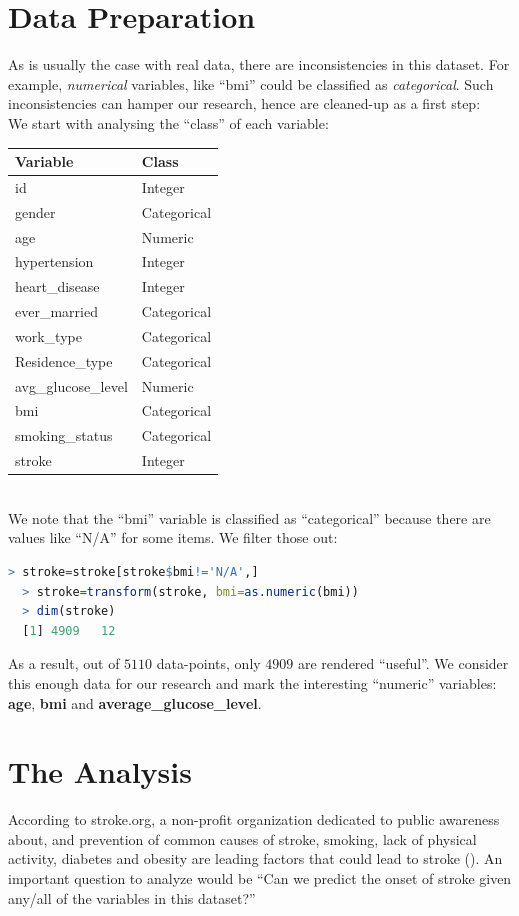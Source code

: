 \documentclass{article}
\begin{document}
\section*{Data Preparation}
As is usually the case with real data, there are inconsistencies in this dataset.
For example, \textit{numerical} variables, like ``bmi'' could be classified 
as \textit{categorical}. Such inconsistencies can hamper our research, 
hence are cleaned-up as a first step:\\

We start with analysing the ``class'' of each variable:\\

\begin{tabular}{l|l}\hline
  Variable & Class \\\hline
  id                  & Integer\\
  gender              & Categorical\\
  age                 & Numeric\\
  hypertension        & Integer\\
  heart\_disease      & Integer\\
  ever\_married       & Categorical\\
  work\_type          & Categorical\\
  Residence\_type     & Categorical\\
  avg\_glucose\_level & Numeric\\
  bmi                 & Categorical\\
  smoking\_status     & Categorical\\
  stroke              & Integer
\end{tabular}\\

We note that the ``bmi'' variable is classified as ``categorical''
because there are values like ``N/A'' for some items. We filter those out:
\begin{lstlisting}[backgroundcolor = \color{lightgray},language = R]
  > stroke=stroke[stroke$bmi!='N/A',]
  > stroke=transform(stroke, bmi=as.numeric(bmi))
  > dim(stroke)
  [1] 4909   12
\end{lstlisting}
As a result, out of $5110$ data-points, only $4909$ are 
rendered ``useful''. We consider this enough data for our research
and mark the interesting ``numeric'' variables:
\textbf{age}, \textbf{bmi} and \textbf{average\_glucose\_level}.
\pagebreak

\section*{The Analysis}
According to stroke.org, a non-profit organization dedicated to public awareness about,
and prevention of common causes of stroke, smoking, lack of physical activity, diabetes and 
obesity are leading factors that could lead to stroke (\cite{strokeorg}). An important
question to analyze would be ``Can we predict 
the onset of stroke given any/all of the variables in this dataset?''\\
\end{document}
